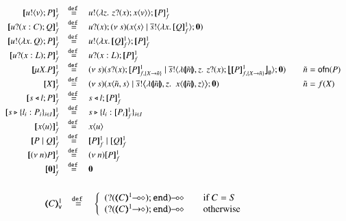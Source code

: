 \begin{figure}[h!]
\[
	\begin{array}{rcll}
			\pmapp{\bout{u}{v} P}{1}{f}	&\defeq&	\bout{u}{ \abs{z}{\,\binp{z}{x} \appl{x}{v}} } \pmapp{P}{1}{f}
		\\
		\pmapp{\binp{u}{x: C} Q}{1}{f}	&\defeq&	\binp{u}{x} \newsp{s}{\appl{x}{s} \Par \bout{\dual{s}}{\abs{x}{\pmapp{Q}{1}{f}}} \inact}
		\\
				\pmapp{\bout{u}{\abs{x}{Q}} P}{1}{f} &\defeq& \bout{u}{\abs{x}{\pmapp{Q}{1}{f}}} \pmapp{P}{1}{f}
		\\
		\pmapp{\binp{u}{x: L} P}{1}{f}	&\defeq&	\binp{u}{x: L} \pmapp{P}{1}{f}
		\\
		\pmapp{\recp{X}{P}}{1}{f} &\defeq&
		\newsp{s}{\binp{s}{x} \pmapp{P}{1}{{f,\{\varp{X}\to \tilde{n}\}}} \Par
		\bout{\dual{s}}{\abs{\vmap{\tilde{n}}, z } \,{\binp{z}{x} \auxmap{\pmapp{P}{1}{{f,\{\varp{X}\to \tilde{n}\}}}}{\es}}} \inact} &
		\quad \tilde{n} = \ofn{P}
		\\
		\pmapp{\varp{X}}{1}{f} &\defeq& \newsp{s}{\appl{x}{\tilde{n}, s} \Par \bbout{\dual{s}}{ \abs{\vmap{\tilde{n}},z}\,\,{\appl{x}{ \vmap{\tilde{n}}, z}}} \inact} &
		\quad \tilde{n} = f(\varp{X})
		\\
		\pmapp{\bsel{s}{l} P}{1}{f}	&\defeq&	\bsel{s}{l} \pmapp{P}{1}{f}
		\\
		\pmapp{\bbra{s}{l_i: P_i}_{i \in I}}{1}{f} &\defeq& \bbra{s}{l_i: \pmapp{P_i}{1}{f}}_{i \in I}
		\\
		\pmapp{\appl{x}{u}}{1}{f}	&\defeq&	\appl{x}{u}
		\\
		\pmapp{P \Par Q}{1}{f}		&\defeq&	\pmapp{P}{1}{f} \Par \pmapp{Q}{1}{f}
		\\
		\pmapp{\news{n} P}{1}{f}	&\defeq&	\news{n} \pmapp{P}{1}{f}
		\\
		\pmapp{\inact}{1}{f}		&\defeq&	\inact
	\end{array}
\]
%
\[
	\begin{array}{rcl}
	\end{array}
\]
%
\[
	\begin{array}{c}
		\begin{array}{rcl}
			\tmap{C}{1}_\mathsf{v}		&\defeq&
			\left\{
			\begin{array}{rcl}
				\lhot{(\btinp{\lhot{\tmap{C}{1}}} \tinact)} && \textrm{if } C = S\\
				\lhot{(\btinp{\shot{\tmap{C}{1}}} \tinact)} && \textrm{otherwise}\\
			\end{array}
			\right.
			\\

\end{array}
\end{array}\]
\end{figure}
